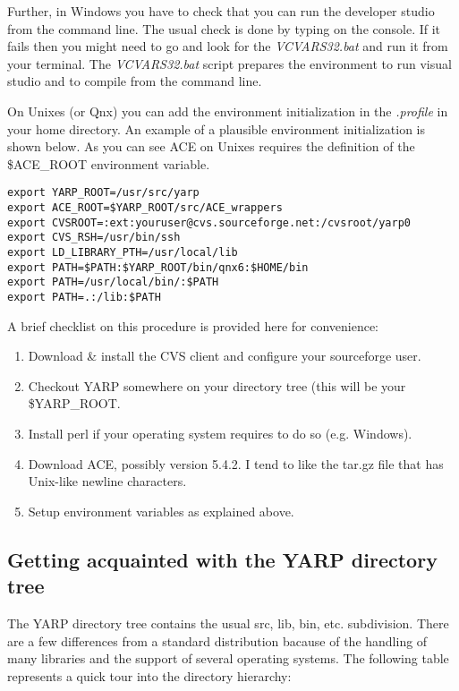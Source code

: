Further, in Windows you have to check that you can run the developer studio from the command line. The usual check is done by typing  on the console. If it fails then you might need to go and look for the {\em VCVARS32.bat} and run it from your terminal. The {\em VCVARS32.bat} script prepares the environment to run visual studio and to compile from the command line.

On Unixes (or Qnx) you can add the environment initialization in the {\em .profile} in your home directory. An example of a plausible environment initialization is shown below. As you can see ACE on Unixes requires the definition of the \$ACE\_ROOT environment variable.

\begin{verbatim}
export YARP_ROOT=/usr/src/yarp
export ACE_ROOT=$YARP_ROOT/src/ACE_wrappers
export CVSROOT=:ext:youruser@cvs.sourceforge.net:/cvsroot/yarp0
export CVS_RSH=/usr/bin/ssh
export LD_LIBRARY_PTH=/usr/local/lib
export PATH=$PATH:$YARP_ROOT/bin/qnx6:$HOME/bin
export PATH=/usr/local/bin/:$PATH
export PATH=.:/lib:$PATH
\end{verbatim}

A brief checklist on this procedure is provided here for convenience:
\begin{enumerate}
	\item Download \& install the CVS client and configure your sourceforge user.
	\item Checkout YARP  somewhere on your directory tree (this will be your \$YARP\_ROOT.
	\item Install perl if your operating system requires to do so (e.g. Windows).
	\item Download ACE, possibly version 5.4.2. I tend to like the tar.gz file that has Unix-like newline characters.
	\item Setup environment variables as explained above.
\end{enumerate}

\subsection{Getting acquainted with the YARP directory tree}
The YARP directory tree contains the usual src, lib, bin, etc. subdivision. There are a few differences from a standard distribution bacause of the handling of many libraries and the support of several operating systems. The following table represents a quick tour into the directory hierarchy:

